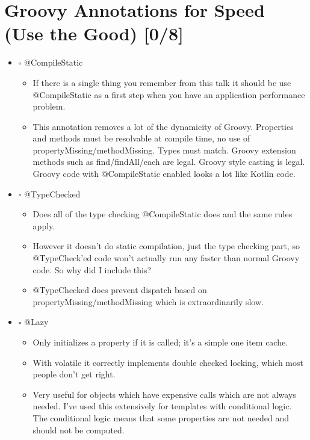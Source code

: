 \documentclass[11pt]{article}
\begin{document}
\section{Groovy Annotations for Speed (Use the Good) [0/8]}
\label{sec:orgheadline5}

\begin{itemize}
\item $\square$ @CompileStatic

\begin{itemize}
\item If there is a single thing you remember from this talk it should be use @CompileStatic as a first step when you have an application performance problem.

\item This annotation removes a lot of the dynamicity of Groovy. Properties and methods must be resolvable at compile time, no use of propertyMissing/methodMissing. Types must match. Groovy extension methods such as find/findAll/each are legal. Groovy style casting is legal. Groovy code with @CompileStatic enabled looks a lot like Kotlin code.
\end{itemize}

\item $\square$ @TypeChecked

\begin{itemize}
\item Does all of the type checking @CompileStatic does and the same rules apply.

\item However it doesn't do static compilation, just the type checking part, so @TypeCheck'ed code won't actually run any faster than normal Groovy code. So why did I include this?

\item @TypeChecked does prevent dispatch based on propertyMissing/methodMissing which is extraordinarily slow.
\end{itemize}

\item $\square$ @Lazy

\begin{itemize}
\item Only initializes a property if it is called; it's a simple one item cache.

\item With volatile it correctly implements double checked locking, which most people don't get right.

\item Very useful for objects which have expensive calls which are not always needed. I've used this extensively for templates with conditional logic. The conditional logic means that some properties are not needed and should not be computed.
\end{itemize}


\end{itemize}
\end{document}
